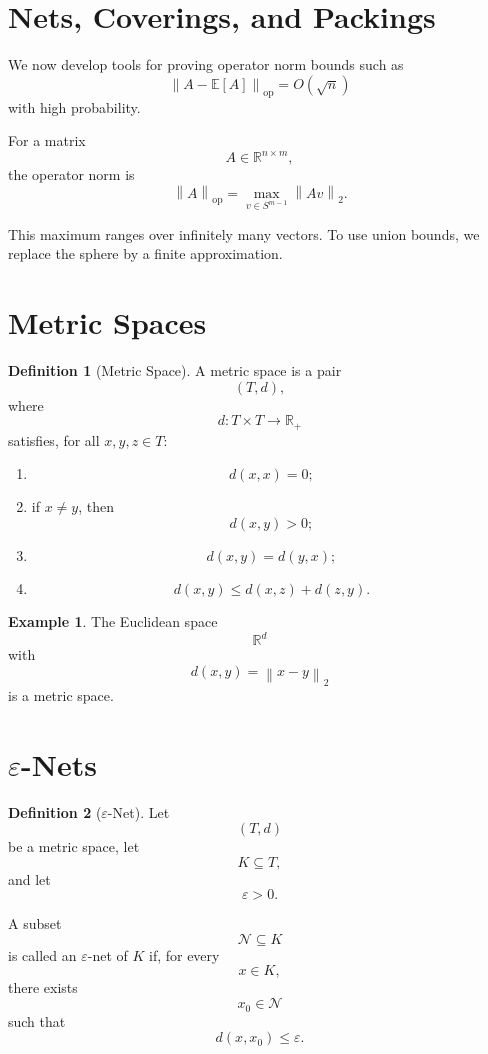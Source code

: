\documentclass[12pt,oneside]{book}
\numberwithin{equation}{section}
\theoremstyle{definition}
\newtheorem{definition}{Definition}[section]
\newtheorem{example}{Example}[section]
\theoremstyle{plain}
\theoremstyle{remark}
\newcommand{\R}{\mathbb{R}}
\newcommand{\E}{\mathbb{E}}
\newcommand{\norm}[1]{\left\lVert #1 \right\rVert}
\begin{document}
\section{Nets, Coverings, and Packings}

We now develop tools for proving operator norm bounds such as
\[
\norm{A-\E[A]}_{\mathrm{op}}
=
O(\sqrt{n})
\]
with high probability.

For a matrix
\[
A\in\R^{n\times m},
\]
the operator norm is
\[
\norm{A}_{\mathrm{op}}
=
\max_{v\in S^{m-1}}
\norm{Av}_2.
\]

This maximum ranges over infinitely many vectors. To use union bounds, we replace the sphere by a finite approximation.

\section{Metric Spaces}

\begin{definition}[Metric Space]
A metric space is a pair
\[
(T,d),
\]
where
\[
d:T\times T\to\R_+
\]
satisfies, for all $x,y,z\in T$:
\begin{enumerate}
\item
\[
d(x,x)=0;
\]
\item if $x\neq y$, then
\[
d(x,y)>0;
\]
\item
\[
d(x,y)=d(y,x);
\]
\item
\[
d(x,y)\leq d(x,z)+d(z,y).
\]
\end{enumerate}
\end{definition}

\begin{example}
The Euclidean space
\[
\R^d
\]
with
\[
d(x,y)=\norm{x-y}_2
\]
is a metric space.
\end{example}

\section{\texorpdfstring{$\varepsilon$}{epsilon}-Nets}

\begin{definition}[$\varepsilon$-Net]
Let
\[
(T,d)
\]
be a metric space, let
\[
K\subseteq T,
\]
and let
\[
\varepsilon>0.
\]

A subset
\[
\mathcal{N}\subseteq K
\]
is called an $\varepsilon$-net of $K$ if, for every
\[
x\in K,
\]
there exists
\[
x_0\in\mathcal{N}
\]
such that
\[
d(x,x_0)\leq \varepsilon.
\]
\end{definition}
\end{document}
